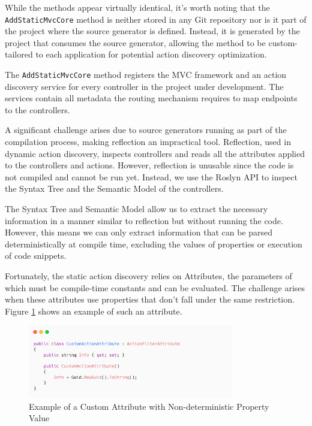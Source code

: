 While the methods appear virtually identical, it's worth noting that the \texttt{AddStaticMvcCore} method is neither stored in any Git repository nor is it part of the project where the source generator is defined. Instead, it is generated by the project that consumes the source generator, allowing the method to be custom-tailored to each application for potential action discovery optimization.

The \texttt{AddStaticMvcCore} method registers the MVC framework and an action discovery service for every controller in the project under development. The services contain all metadata the routing mechanism requires to map endpoints to the controllers.

A significant challenge arises due to source generators running as part of the compilation process, making reflection an impractical tool. Reflection, used in dynamic action discovery, inspects controllers and reads all the attributes applied to the controllers and actions. However, reflection is unusable since the code is not compiled and cannot be run yet. Instead, we use the Roslyn API to inspect the Syntax Tree and the Semantic Model of the controllers.

The Syntax Tree and Semantic Model allow us to extract the necessary information in a manner similar to reflection but without running the code. However, this means we can only extract information that can be parsed deterministically at compile time, excluding the values of properties or execution of code snippets.

Fortunately, the static action discovery relies on Attributes, the parameters of which must be compile-time constants and can be evaluated. The challenge arises when these attributes use properties that don't fall under the same restriction. Figure \ref{fig:custom-property} shows an example of such an attribute.

\begin{figure}[H]
\centering
\includegraphics[width=0.8\textwidth]{graphics/custom-property.png}
\caption{Example of a Custom Attribute with Non-deterministic Property Value}
\label{fig:custom-property}
\end{figure}

